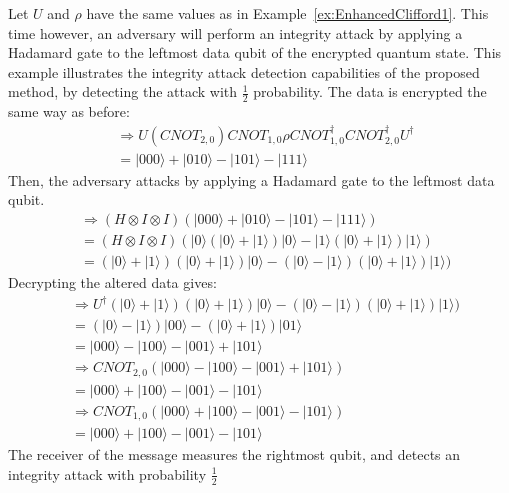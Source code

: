 \begin{example}
\label{ex:IntegrityAttackEnhancedClifford2}
	Let $U$ and $\rho$ have the same values as in Example~\ref{ex:EnhancedClifford1}. This time however, an adversary will perform an integrity attack by applying a Hadamard gate to the leftmost data qubit of the encrypted quantum state. This example illustrates the integrity attack detection capabilities of the proposed method, by detecting the attack with $\frac{1}{2}$ probability. The data is encrypted the same way as before:
	\begin{align}
	& \Rightarrow U (\mathit{CNOT}_{2,0})\mathit{CNOT}_{1,0}\rho \mathit{CNOT}_{1,0}^{\dagger}\mathit{CNOT}_{2,0}^{\dagger} U^{\dagger}\\
	&= |000\rangle + |010\rangle - |101\rangle - |111\rangle
	\end{align}
	Then, the adversary attacks by applying a Hadamard gate to the leftmost data qubit.
	\begin{align}
	& \Rightarrow (H \otimes I \otimes I)(|000\rangle + |010\rangle - |101\rangle - |111\rangle)\\
	&= (H \otimes I \otimes I)(|0\rangle(|0\rangle + |1\rangle)|0\rangle - |1\rangle(|0\rangle + |1\rangle)|1\rangle)\\
	&= (|0\rangle+|1\rangle)(|0\rangle + |1\rangle)|0\rangle - (|0\rangle-|1\rangle)(|0\rangle + |1\rangle)|1\rangle)
	\end{align}
	Decrypting the altered data gives:
	\begin{align}
	& \Rightarrow U^{\dagger}(|0\rangle+|1\rangle)(|0\rangle + |1\rangle)|0\rangle - (|0\rangle-|1\rangle)(|0\rangle + |1\rangle)|1\rangle)\\
	&= (|0\rangle-|1\rangle)|00\rangle - (|0\rangle+|1\rangle)|01\rangle\\
    &= |000\rangle-|100\rangle - |001\rangle+|101\rangle\\
	& \Rightarrow \mathit{CNOT}_{2,0} (|000\rangle-|100\rangle - |001\rangle+|101\rangle)\\
	&= |000\rangle+|100\rangle - |001\rangle-|101\rangle\\
	& \Rightarrow \mathit{CNOT}_{1,0} (|000\rangle+|100\rangle - |001\rangle-|101\rangle)\\
	&= |000\rangle+|100\rangle - |001\rangle-|101\rangle
	\end{align}
The receiver of the message measures the rightmost qubit, and detects an integrity attack with probability $\frac{1}{2}$
\end{example}
